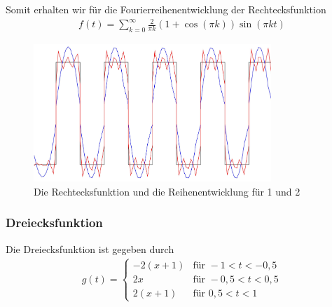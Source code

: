 Somit erhalten wir für die Fourierreihenentwicklung der Rechtecksfunktion
                \begin{align*}
                   f(t) = \sum_{k=0}^\infty \frac{2}{\pi k} (1 + \cos(\pi k)) 
                   \sin(\pi k t) 
                \end{align*}
                \begin{figure}[htb]
                   \centering
                   \includegraphics[width=0.8\textwidth]{Abb/rechteck_fit.pdf} 
                   \caption{Die Rechtecksfunktion und die Reihenentwicklung für 1 und 2}
                \end{figure}

                    \subsubsection*{Dreiecksfunktion}
Die Dreiecksfunktion ist gegeben durch
                \begin{align*}
                   g(t) = \begin{cases}
                    -2(x+1) & \text{für } -1   < t < -0,5 \\
                    2x      & \text{für } -0,5 < t <  0,5 \\
                    2(x+1)  & \text{für } 0,5  < t <  1
                        \end{cases}
                \end{align*}